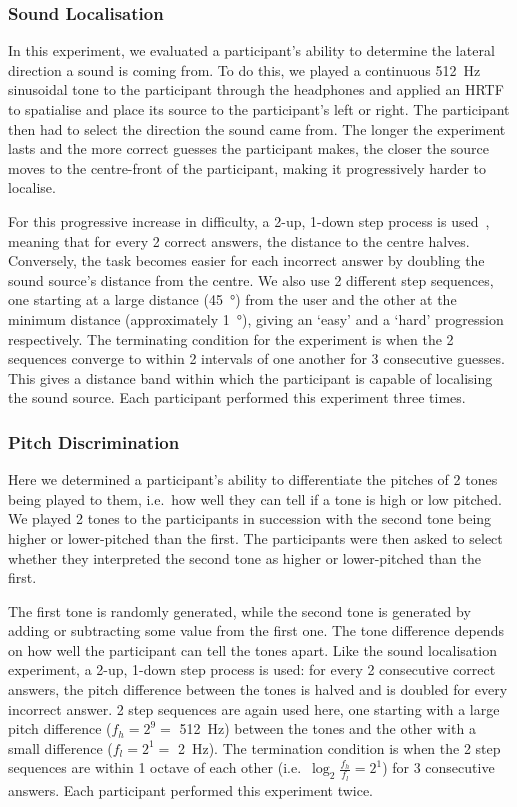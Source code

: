 \documentclass[]{interact}
\begin{document}
\subsubsection{Sound Localisation}

In this experiment, we evaluated a participant's ability to determine the lateral direction a sound is coming from.
To do this, we played a continuous \SI{512}{\hertz} sinusoidal tone to the participant through the headphones and applied an HRTF to spatialise and place its source to the participant's left or right.
The participant then had to select the direction the sound came from.
The longer the experiment lasts and the more correct guesses the participant makes, the closer the source moves to the centre-front of the participant, making it progressively harder to localise. 

For this progressive increase in difficulty, a 2-up, 1-down step process is used~\citep{wetherill1965sequential,levitt1971transformed}, meaning that for every 2 correct answers, the distance to the centre halves.
Conversely, the task becomes easier for each incorrect answer by doubling the sound source's distance from the centre.
We also use 2 different step sequences, one starting at a large distance (\SI{45}{\degree}) from the user and the other at the minimum distance (approximately \SI{1}{\degree}), giving an `easy' and a `hard' progression respectively.
The terminating condition for the experiment is when the 2 sequences converge to within 2 intervals of one another for 3 consecutive guesses.
This gives a distance band within which the participant is capable of localising the sound source.
Each participant performed this experiment three times. 

\subsubsection{Pitch Discrimination}

Here we determined a participant's ability to differentiate the pitches of 2 tones being played to them, i.e.\ how well they can tell if a tone is high or low pitched.
We played 2 tones to the participants in succession with the second tone being higher or lower-pitched than the first.
The participants were then asked to select whether they interpreted the second tone as higher or lower-pitched than the first.

The first tone is randomly generated, while the second tone is generated by adding or subtracting some value from the first one.
The tone difference depends on how well the participant can tell the tones apart.
Like the sound localisation experiment, a 2-up, 1-down step process is used: for every 2 consecutive correct answers, the pitch difference between the tones is halved and is doubled for every incorrect answer.
2 step sequences are again used here, one starting with a large pitch difference ($f_h=2^9=$ \SI{512}{\hertz}) between the tones and the other with a small difference ($f_l=2^1=$ \SI{2}{\hertz}).
The termination condition is when the 2 step sequences are within 1 octave of each other (i.e.\ $\log_2\frac{f_h}{f_l}=2^1$) for 3 consecutive answers.
Each participant performed this experiment twice. 
\end{document}
